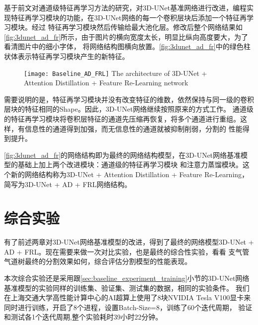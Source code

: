 基于前文对通道级特征再学习方法的研究，对3D-UNet基准网络进行改进，编程实现特征再学习模块的功能，在3D-UNet网络的每一个卷积层块后添加一个特征再学习模块。经过
特征再学习模块然后传输给最大池化层。修改后整个网络结果如\autoref{fig:3dunet_ad_fr}所示，由于图片的横向宽度太长，明显比纵向高度要大，为了看清图片中的细小字体，
将网络结构图横向放置。\autoref{fig:3dunet_ad_fr}中的绿色柱状体表示特征再学习模块产生的新特征。
\begin{figure}[!htp]
    \centering
    \texttt{[image: Baseline\_AD\_FRL]}
        {The architecture of 3D-UNet + Attention Distillation + Feature Re-Learning network}
    \label{fig:3dunet_ad_fr}
\end{figure}
需要说明的是，特征再学习模块并没有改变特征的维数，依然保持与同一级的卷积层块的特征相同的Shape。因此，3D-UNet网络继续按照原来的方式工作。
通道级的特征再学习模块将卷积层特征的通道先压缩再恢复，将多个通道进行重组。这样，有信息性的通道得到加强，而无信息性的通道就被抑制削弱，分割的
性能得到提升。

\autoref{fig:3dunet_ad_fr}的网络结构即为最终的网络结构模型，在3D-UNet网络基准模型的基础上加上两个改进模块：通道级的特征再学习模块
和注意力蒸馏模块。这个新的网络结构称为3D-UNet + Attention Distillation + Feature Re-Learning，简写为3D-UNet + AD + FRL网络结构。

\section{综合实验}

有了前述两章对3D-UNet网络基准模型的改进，得到了最终的网络模型3D-UNet + AD + FRL。现在需要来做一次对比实验，也是最终的综合性实验，看看
支气管气道树最终的分割效果如何，综合评估分割模型的性能表现。

本次综合实验还是采用跟\ref{sec:baseline_experiment_training}小节的3D-UNet网络基准模型的实验同样的训练集、验证集、测试集的数据，相同的实验条件。
我们在上海交通大学高性能计算中心的AI超算上使用了8块NVIDIA Tesla V100显卡来同时进行训练，开启了8个进程，设置Batch-Size=8，训练了60个迭代周期，
验证和测试各1个迭代周期,整个实验耗时39小时22分钟。

